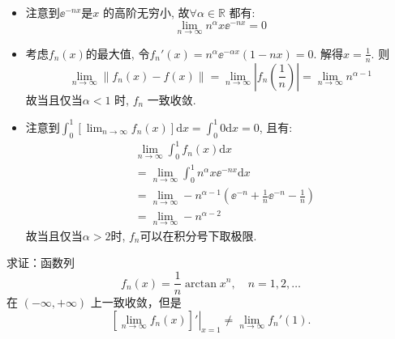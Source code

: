 \begin{solution}
    \begin{itemize}
        \item 注意到\(\ee^{-nx}\)是\(x\) 的高阶无穷小, 故\(\forall \alpha
            \in \mathbb{R}\) 都有: \[
                \lim_{n \to \infty} n^{\alpha} x \ee^{-n x} = 0
            \]
        \item 考虑\(f_{n}(x)\)的最大值, 令\(f_{n}'(x) = n^{\alpha}
            \ee^{-\alpha x} (1 - n x) = 0\). 解得\(x =
            \frac{1}{n}\).
            则\[
                \lim_{n \to \infty} \left\lVert f_{n}(x) - f(x)
                \right\rVert = \lim_{n \to \infty} \left|
                f_{n}\left(\frac{1}{n}\right) \right| = \lim_{n \to
                \infty} n^{\alpha - 1}
            \]
            故当且仅当\(\alpha <  1\) 时, \(f_{n}\) 一致收敛.
        \item 注意到\(\int_0^1 \left[ \lim_{n \to \infty} f_n(x) \right]
            \mathrm{d}x = \int_0^1 0 \mathrm{d}x = 0\), 且有:
            \begin{align*}
                & \lim_{n \to \infty} \int_0^1 f_n(x) \mathrm{d}x \\
                & = \lim_{n \to \infty} \int_{0}^{1} n^{\alpha} x
                \ee^{-nx} \mathrm{d}x                       \\
                & = \lim_{n \to \infty} -n^{\alpha - 1} \left(
                    \ee^{-n} + \frac{1}{n}\ee^{-n}
                -\frac{1}{n} \right)                               \\
                & = \lim_{n \to \infty} -n^{\alpha - 2}
            \end{align*}
            故当且仅当\(\alpha > 2\)时, \(f_{n}\)可以在积分号下取极限.
    \end{itemize}
\end{solution}

\begin{problem}
    求证：函数列
    \[
        f_n(x) = \frac{1}{n} \arctan x^n, \quad n = 1, 2, \dots
    \]
    在 \((-\infty, +\infty)\) 上一致收敛，但是
    \[
        \left. \left[ \lim_{n \to \infty} f_n(x) \right]'
        \right|_{x = 1}
        \neq \lim_{n \to \infty} f_n'(1).
    \]
\end{problem}

